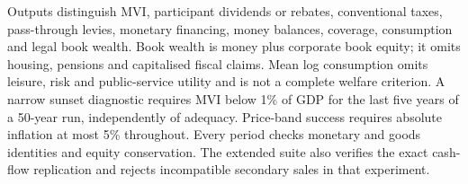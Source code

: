 Outputs distinguish MVI, participant dividends or rebates, conventional taxes, pass-through levies, monetary financing, money balances, coverage, consumption and legal book wealth. Book wealth is money plus corporate book equity; it omits housing, pensions and capitalised fiscal claims. Mean log consumption omits leisure, risk and public-service utility and is not a complete welfare criterion. A narrow sunset diagnostic requires MVI below 1\% of GDP for the last five years of a 50-year run, independently of adequacy. Price-band success requires absolute inflation at most 5\% throughout. Every period checks monetary and goods identities and equity conservation. The extended suite also verifies the exact cash-flow replication and rejects incompatible secondary sales in that experiment.
